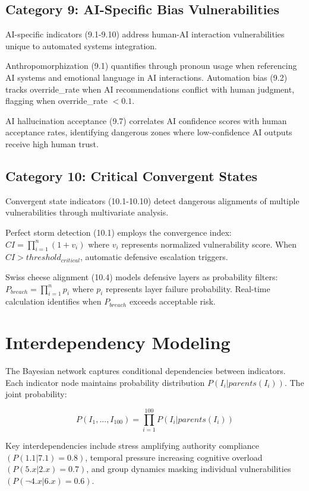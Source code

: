 \documentclass[10pt, twocolumn]{article}
\begin{document}
\subsection{Category 9: AI-Specific Bias Vulnerabilities}

AI-specific indicators (9.1-9.10) address human-AI interaction vulnerabilities unique to automated systems integration.

Anthropomorphization (9.1) quantifies through pronoun usage when referencing AI systems and emotional language in AI interactions. Automation bias (9.2) tracks override\_rate when AI recommendations conflict with human judgment, flagging when override\_rate $< 0.1$.

AI hallucination acceptance (9.7) correlates AI confidence scores with human acceptance rates, identifying dangerous zones where low-confidence AI outputs receive high human trust.

\subsection{Category 10: Critical Convergent States}

Convergent state indicators (10.1-10.10) detect dangerous alignments of multiple vulnerabilities through multivariate analysis.

Perfect storm detection (10.1) employs the convergence index: $CI = \prod_{i=1}^{n} (1 + v_i)$ where $v_i$ represents normalized vulnerability score. When $CI > threshold_{critical}$, automatic defensive escalation triggers.

Swiss cheese alignment (10.4) models defensive layers as probability filters: $P_{breach} = \prod_{i=1}^{n} p_i$ where $p_i$ represents layer failure probability. Real-time calculation identifies when $P_{breach}$ exceeds acceptable risk.

\section{Interdependency Modeling}

The Bayesian network captures conditional dependencies between indicators. Each indicator node maintains probability distribution $P(I_i | parents(I_i))$. The joint probability:

$$P(I_1, ..., I_{100}) = \prod_{i=1}^{100} P(I_i | parents(I_i))$$

Key interdependencies include stress amplifying authority compliance $(P(1.1|7.1) = 0.8)$, temporal pressure increasing cognitive overload $(P(5.x|2.x) = 0.7)$, and group dynamics masking individual vulnerabilities $(P(\neg 4.x|6.x) = 0.6)$.
\end{document}
